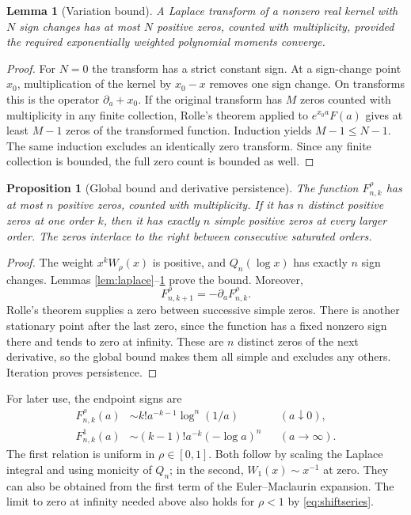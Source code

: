 \documentclass[11pt]{article}
\numberwithin{equation}{section}
\newtheorem{lemma}[theorem]{Lemma}
\newtheorem{proposition}[theorem]{Proposition}
\theoremstyle{definition}\newtheorem{definition}[theorem]{Definition}
\theoremstyle{remark}\newtheorem{remark}[theorem]{Remark}
\begin{document}
\begin{lemma}[Variation bound]\label{lem:variation}
A Laplace transform of a nonzero real kernel with $N$ sign changes has at most $N$ positive zeros, counted with multiplicity, provided the required exponentially weighted polynomial moments converge.
\end{lemma}
\begin{proof}
For $N=0$ the transform has a strict constant sign. At a sign-change point $x_0$, multiplication of the kernel by $x_0-x$ removes one sign change. On transforms this is the operator $\partial_a+x_0$. If the original transform has $M$ zeros counted with multiplicity in any finite collection, Rolle's theorem applied to $e^{x_0a}F(a)$ gives at least $M-1$ zeros of the transformed function. Induction yields $M-1\leq N-1$. The same induction excludes an identically zero transform. Since any finite collection is bounded, the full zero count is bounded as well.
\end{proof}

\begin{proposition}[Global bound and derivative persistence]\label{prop:global}
The function $F_{n,k}^{\rho}$ has at most $n$ positive zeros, counted with multiplicity. If it has $n$ distinct positive zeros at one order $k$, then it has exactly $n$ simple positive zeros at every larger order. The zeros interlace to the right between consecutive saturated orders.
\end{proposition}
\begin{proof}
The weight $x^kW_\rho(x)$ is positive, and $Q_n(\log x)$ has exactly $n$ sign changes. Lemmas \ref{lem:laplace}--\ref{lem:variation} prove the bound. Moreover,
\begin{equation}\label{eq:derivative}
F_{n,k+1}^{\rho}=-\partial_a F_{n,k}^{\rho}.
\end{equation}
Rolle's theorem supplies a zero between successive simple zeros. There is another stationary point after the last zero, since the function has a fixed nonzero sign there and tends to zero at infinity. These are $n$ distinct zeros of the next derivative, so the global bound makes them all simple and excludes any others. Iteration proves persistence.
\end{proof}

For later use, the endpoint signs are
\begin{align}
F_{n,k}^{\rho}(a)&\sim k!a^{-k-1}\log^n(1/a) &&(a\downarrow0),\label{eq:small-a}\\
F_{n,k}^{1}(a)&\sim (k-1)!a^{-k}(-\log a)^n &&(a\to\infty).\label{eq:large-a}
\end{align}
The first relation is uniform in $\rho\in[0,1]$. Both follow by scaling the Laplace integral and using monicity of $Q_n$; in the second, $W_1(x)\sim x^{-1}$ at zero. They can also be obtained from the first term of the Euler--Maclaurin expansion. The limit to zero at infinity needed above also holds for $\rho<1$ by \eqref{eq:shiftseries}.
\end{document}
